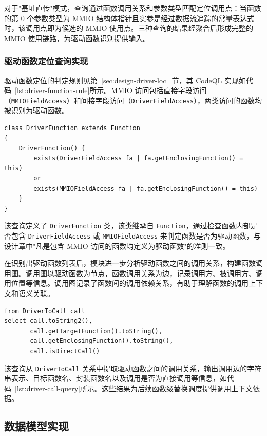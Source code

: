 对于"基址直传"模式，查询通过函数调用关系和参数类型匹配定位调用点：当函数的第 0 个参数类型为 MMIO 结构体指针且实参是经过数据流追踪的常量表达式时，该调用点即为候选的 MMIO 使用点。三种查询的结果经聚合后形成完整的 MMIO 使用链路，为驱动函数识别提供输入。

\subsubsection{驱动函数定位查询实现}

驱动函数定位的判定规则见第~\ref{sec:design-driver-loc}~节，其 CodeQL 实现如代码~\ref{lst:driver-function-rule}所示。MMIO 访问包括直接字段访问（\texttt{MMIOFieldAccess}）和间接字段访问（\texttt{DriverFieldAccess}），两类访问的函数均被识别为驱动函数。

\begin{lstlisting}[style=CodeQL,language=CodeQL, caption={驱动函数判定规则},label=lst:driver-function-rule]
class DriverFunction extends Function
{
    DriverFunction() {
        exists(DriverFieldAccess fa | fa.getEnclosingFunction() = this)
        or
        exists(MMIOFieldAccess fa | fa.getEnclosingFunction() = this)
    }
}
\end{lstlisting}

该查询定义了 \texttt{DriverFunction} 类，该类继承自 \texttt{Function}，通过检查函数内部是否包含 \texttt{DriverFieldAccess} 或 \texttt{MMIOFieldAccess} 来判定函数是否为驱动函数，与设计章中"凡是包含 MMIO 访问的函数均定义为驱动函数"的准则一致。

在识别出驱动函数列表后，模块进一步分析驱动函数之间的调用关系，构建函数调用图。调用图以驱动函数为节点，函数调用关系为边，记录调用方、被调用方、调用位置等信息。调用图记录了函数间的调用依赖关系，有助于理解函数的调用上下文和语义关联。

\begin{lstlisting}[style=CodeQL,language=CodeQL, caption={驱动函数调用关系查询},label=lst:driver-call-query]
from DriverToCall call
select call.toString2(),
       call.getTargetFunction().toString(),
       call.getEnclosingFunction().toString(),
       call.isDirectCall()
\end{lstlisting}

该查询从 \texttt{DriverToCall} 关系中提取驱动函数之间的调用关系，输出调用边的字符串表示、目标函数名、封装函数名以及调用是否为直接调用等信息，如代码~\ref{lst:driver-call-query}所示。这些结果为后续函数级替换调度提供调用上下文依据。

\subsection{数据模型实现}

